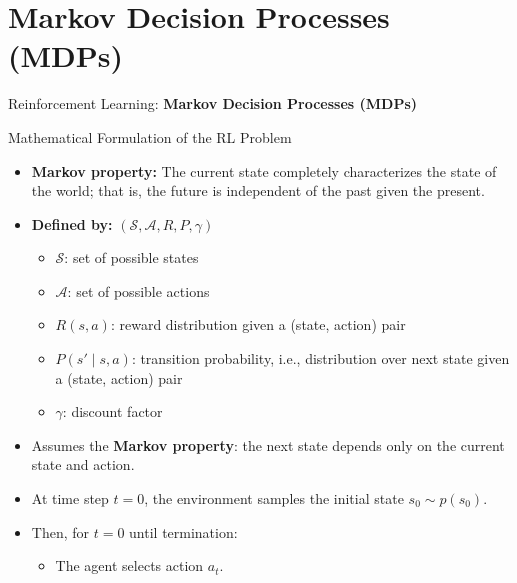 \section{Markov Decision Processes (MDPs)}
\begin{frame}{}
    \LARGE Reinforcement Learning: \textbf{Markov Decision Processes (MDPs)}
\end{frame}

\begin{frame}[allowframebreaks]{Mathematical Formulation of the RL Problem}
    \begin{itemize}
        \item \textbf{Markov property:} The current state completely characterizes the state of the world; that is, the future is independent of the past given the present.
        \item \textbf{Defined by:} $(\mathcal{S}, \mathcal{A}, R, P, \gamma)$
        \begin{itemize}
            \item $\mathcal{S}$: set of possible states
            \item $\mathcal{A}$: set of possible actions
            \item $R(s,a)$: reward distribution given a (state, action) pair
            \item $P(s' \mid s, a)$: transition probability, i.e., distribution over next state given a (state, action) pair
            \item $\gamma$: discount factor
        \end{itemize}
        \item Assumes the \textbf{Markov property}: the next state depends only on the current state and action.
    \end{itemize}
\framebreak
    \begin{figure}
        \centering
    \end{figure}
\framebreak
    \begin{itemize}
        \item At time step $t = 0$, the environment samples the initial state $s_0 \sim p(s_0)$.
        \item Then, for $t = 0$ until termination:
        \begin{itemize}
            \item The agent selects action $a_t$.

\end{itemize}
\end{itemize}
\end{frame}

